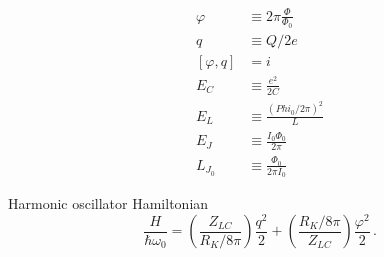 \begin{align}
\varphi & \equiv 2 \pi \frac{\Phi}{\Phi_0} \\
q & \equiv Q / 2 e \\
[\varphi, q] &= i \\
E_C & \equiv \frac{e^2}{2C} \\
E_L & \equiv \frac{(Phi_0 / 2 \pi)^2}{L} \\
E_J & \equiv \frac{I_0 \Phi_0}{2 \pi} \\
L_{J_0} & \equiv \frac{\Phi_0}{2\pi I_0}
\end{align}

Harmonic oscillator Hamiltonian
\begin{displaymath}
\frac{H}{\hbar \omega_0}
  = \left( \frac{Z_{LC}}{R_K / 8 \pi} \right) \frac{q^2}{2}
  + \left( \frac{R_K / 8 \pi}{Z_{LC}} \right) \frac{\varphi^2}{2} \, .
\end{displaymath}
